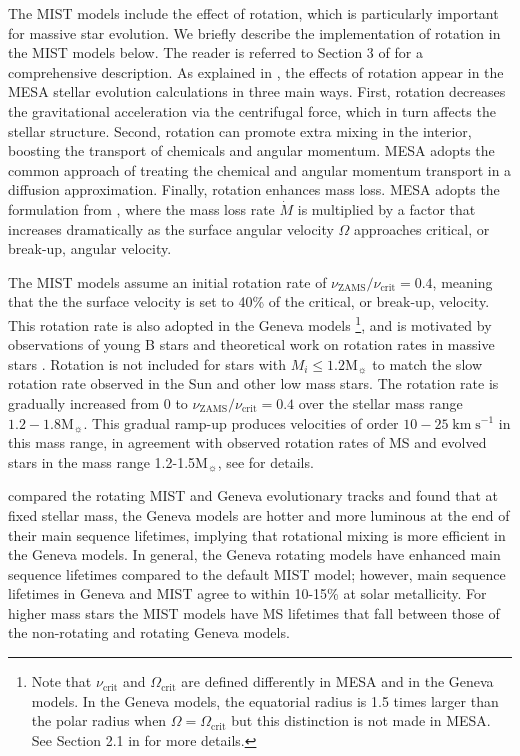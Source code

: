 \documentclass[preprint2,trackchanges]{aastex62}
\newcommand\Msun{\ensuremath{\mathrm{M_{\sun}}}\xspace}
\newcommand{\kms}{\ensuremath{\;\mathrm{km}\;\mathrm{s}^{-1}}\xspace}
\begin{document}
The MIST models include the effect of rotation, which is particularly important for massive star evolution. We briefly describe the implementation of rotation in the MIST models below. The reader is referred to Section 3 of \citet{Choi+2016} for a comprehensive description. As explained in \citet{Choi+2017}, the effects of rotation appear in the MESA stellar evolution calculations in three main ways. First, rotation decreases the gravitational acceleration via the centrifugal force, which in turn affects the stellar structure. Second, rotation can promote extra mixing in the interior, boosting the transport of chemicals and angular momentum. MESA adopts the common approach of treating the chemical and angular momentum transport in a diffusion approximation. Finally, rotation enhances mass loss. MESA adopts the formulation from \citet{Langer+1998}, where the mass loss rate $\dot{M}$ is multiplied by a factor that increases dramatically as the surface angular velocity $\Omega$ approaches critical, or break-up, angular velocity.

The MIST models assume an initial rotation rate of  $\nu_{\mathrm{ZAMS}}/\nu_{\mathrm{crit}} = 0.4$, meaning that the the surface velocity is set to 40\% of the critical, or break-up, velocity. This rotation rate is also adopted in the Geneva models \citep{Ekstrom+2012}\footnote{Note that $\nu_{\mathrm{crit}}$ and $\Omega_{\mathrm{crit}}$ are defined differently in MESA and in the Geneva models. In the Geneva models, the equatorial radius is 1.5 times larger than the polar radius when $\Omega = \Omega_{\mathrm{crit}}$ but this distinction is not made in MESA. See Section 2.1 in \citet{Georgy+2013} for more details.}, and is motivated by observations of young B stars \citep{Huang+2010} and theoretical work on rotation rates in massive stars \citep{Rosen+2012}. Rotation is not included for stars with $M_{i} \leq 1.2$\Msun to match the slow rotation rate observed in the Sun and other low mass stars. The rotation rate is gradually increased from 0 to $\nu_{\mathrm{ZAMS}}/\nu_{\mathrm{crit}} = 0.4$ over the stellar mass range $1.2-1.8$\Msun. This gradual ramp-up produces velocities of order $10-25$\kms in this mass range, in agreement with observed rotation rates of MS and evolved stars in the mass range 1.2-1.5\Msun \citep{Wolff+1997, Canto+2011}, see \citet{Choi+2016} for details.

\citet{Choi+2016} compared the rotating MIST and Geneva evolutionary tracks and found that at fixed stellar mass, the Geneva models are hotter and more luminous at the end of their main sequence lifetimes, implying that rotational mixing is more efficient in the Geneva models. In general, the Geneva rotating models have enhanced main sequence lifetimes compared to the default MIST model; however, main sequence lifetimes in Geneva and MIST agree to within 10-15\% at solar metallicity. For higher mass stars the MIST models have MS lifetimes that fall between those of the non-rotating and rotating Geneva models.
\end{document}
